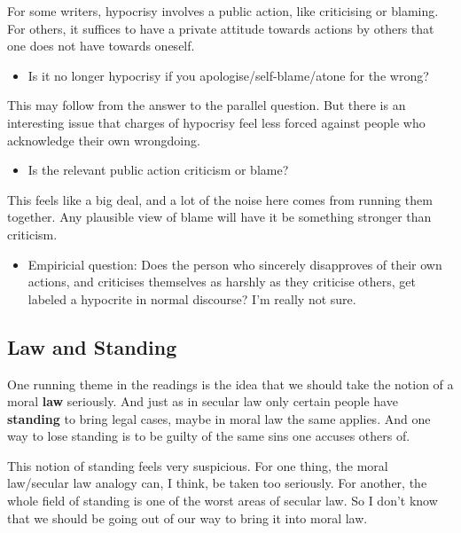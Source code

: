 \documentclass[
]{article}
\providecommand{\tightlist}{%
  \setlength{\itemsep}{0pt}\setlength{\parskip}{0pt}}
\begin{document}
For some writers, hypocrisy involves a public action, like criticising
or blaming. For others, it suffices to have a private attitude towards
actions by others that one does not have towards oneself.

\begin{itemize}
\tightlist
\item
  Is it no longer hypocrisy if you apologise/self-blame/atone for the
  wrong?
\end{itemize}

This may follow from the answer to the parallel question. But there is
an interesting issue that charges of hypocrisy feel less forced against
people who acknowledge their own wrongdoing.

\begin{itemize}
\tightlist
\item
  Is the relevant public action criticism or blame?
\end{itemize}

This feels like a big deal, and a lot of the noise here comes from
running them together. Any plausible view of blame will have it be
something stronger than criticism.

\begin{itemize}
\tightlist
\item
  Empiricial question: Does the person who sincerely disapproves of
  their own actions, and criticises themselves as harshly as they
  criticise others, get labeled a hypocrite in normal discourse? I'm
  really not sure.
\end{itemize}

\hypertarget{law-and-standing}{%
\subsection{Law and Standing}\label{law-and-standing}}

One running theme in the readings is the idea that we should take the
notion of a moral \textbf{law} seriously. And just as in secular law
only certain people have \textbf{standing} to bring legal cases, maybe
in moral law the same applies. And one way to lose standing is to be
guilty of the same sins one accuses others of.

This notion of standing feels very suspicious. For one thing, the moral
law/secular law analogy can, I think, be taken too seriously. For
another, the whole field of standing is one of the worst areas of
secular law. So I don't know that we should be going out of our way to
bring it into moral law.
\end{document}
